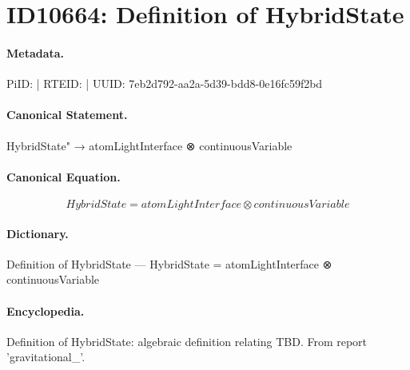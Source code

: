 \section*{ID10664: Definition of HybridState}
\paragraph{Metadata.}
PiID:  | RTEID:  | UUID: 7eb2d792-aa2a-5d39-bdd8-0e16fc59f2bd

\paragraph{Canonical Statement.}
HybridState" → atomLightInterface ⊗ continuousVariable

\paragraph{Canonical Equation.}
\[
HybridState = atomLightInterface ⊗ continuousVariable
\]

\paragraph{Dictionary.}
Definition of HybridState — HybridState = atomLightInterface ⊗ continuousVariable

\paragraph{Encyclopedia.}
Definition of HybridState: algebraic definition relating TBD. From report 'gravitational\_'.
